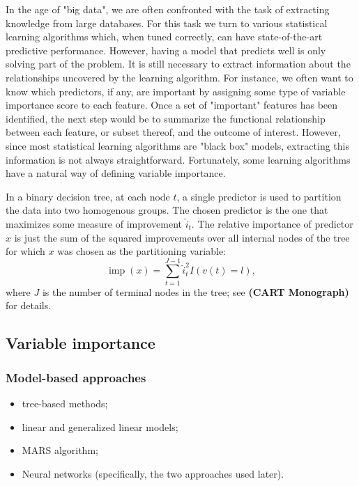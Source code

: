 \documentclass{article}
\def\ref#1{\textbf{(#1)}}
\DeclareMathOperator{\imp}{imp}
\begin{document}
In the age of "big data", we are often confronted with the task of extracting knowledge from large databases. For this task we turn to various statistical learning algorithms which, when tuned correctly, can have state-of-the-art predictive performance. However, having a model that predicts well is only solving part of the problem. It is still necessary to extract information about the relationships uncovered by the learning algorithm. For instance, we often want to know which predictors, if any, are important by assigning some type of variable importance score to each feature. Once a set of "important" features has been identified, the next step would be to summarize the functional relationship between each feature, or subset thereof, and the outcome of interest. However, since most statistical learning algorithms are "black box" models, extracting this information is not always straightforward. Fortunately, some learning algorithms have a natural way of defining variable importance.

In a binary decision tree, at each node $t$, a single predictor is used to partition the data into two homogenous groups. The chosen predictor is the one that maximizes some measure of improvement $\widehat{i}_t$. The relative importance of predictor $x$ is just the sum of the squared improvements over all internal nodes of the tree for which $x$ was chosen as the partitioning variable:
\begin{equation}
\imp\left(x\right) = \sum_{t = 1}^{J - 1}\widehat{i}_t^2 I\left(v\left(t\right) = l\right),
\end{equation}
where $J$ is the number of terminal nodes in the tree; see \ref{CART Monograph} for details.


\subsection{Variable importance}

\subsubsection{Model-based approaches}
\begin{itemize}
  \item tree-based methods;
  \item linear and generalized linear models;
  \item MARS algorithm;
  \item Neural networks (specifically, the two approaches used later).
\end{itemize}
\end{document}
